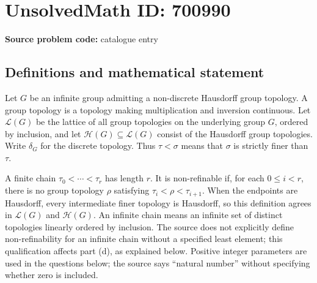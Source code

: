 \documentclass[11pt]{article}
\begin{document}
\section*{UnsolvedMath ID: 700990}
\textbf{Source problem code:} catalogue entry
\subsection{Definitions and mathematical statement}
Let \(G\) be an infinite group admitting a non-discrete Hausdorff group topology. A group topology is a topology making multiplication and inversion continuous. Let \(\mathcal L(G)\) be the lattice of all group topologies on the underlying group \(G\), ordered by inclusion, and let \(\mathcal H(G)\subseteq\mathcal L(G)\) consist of the Hausdorff group topologies. Write \(\delta_G\) for the discrete topology. Thus \(\tau<\sigma\) means that \(\sigma\) is strictly finer than \(\tau\).

A finite chain \(\tau_0<\cdots<\tau_r\) has length \(r\). It is non-refinable if, for each \(0\leq i<r\), there is no group topology \(\rho\) satisfying \(\tau_i<\rho<\tau_{i+1}\). When the endpoints are Hausdorff, every intermediate finer topology is Hausdorff, so this definition agrees in \(\mathcal L(G)\) and \(\mathcal H(G)\). An infinite chain means an infinite set of distinct topologies linearly ordered by inclusion. The source does not explicitly define non-refinability for an infinite chain without a specified least element; this qualification affects part (d), as explained below. Positive integer parameters are used in the questions below; the source says ``natural number'' without specifying whether zero is included.
\end{document}
